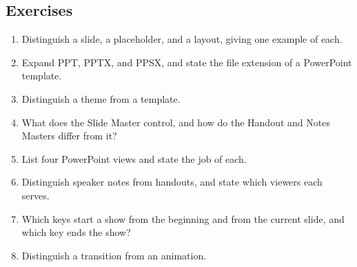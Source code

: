 \documentclass[11pt]{article}
\begin{document}
\subsection*{Exercises}
\begin{enumerate}[label=\arabic*.]
  \item Distinguish a slide, a placeholder, and a layout, giving one example
    of each.
  \item Expand PPT, PPTX, and PPSX, and state the file extension of a
    PowerPoint template.
  \item Distinguish a theme from a template.
  \item What does the Slide Master control, and how do the Handout and Notes
    Masters differ from it?
  \item List four PowerPoint views and state the job of each.
  \item Distinguish speaker notes from handouts, and state which viewers each
    serves.
  \item Which keys start a show from the beginning and from the current slide,
    and which key ends the show?
  \item Distinguish a transition from an animation.
\end{enumerate}
\end{document}
